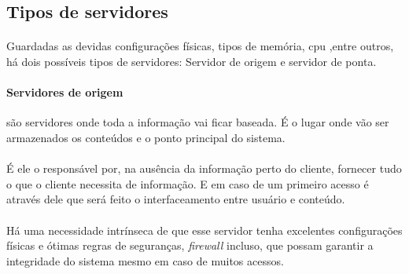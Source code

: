 \subsection{Tipos de servidores}
\label{section:tipos_de_servidores}
\paragraph{}
Guardadas as devidas configura\c{c}\~oes f\'isicas, tipos de mem\'oria, cpu ,entre outros, h\'a dois poss\'iveis tipos de servidores:  Servidor de origem e servidor de ponta.

\paragraph{Servidores de origem}s\~ao servidores onde toda a informa\c{c}\~ao vai ficar baseada. \'E o lugar onde v\~ao ser armazenados os conte\'udos e o ponto principal do sistema.
\paragraph{}
\'E ele o respons\'avel por, na aus\^encia da informa\c{c}\~ao perto do cliente, fornecer tudo o que o cliente necessita de informa\c{c}\~ao. E em caso de um primeiro acesso \'e atrav\'es dele que ser\'a feito o interfaceamento entre usu\'ario e conte\'udo.
\paragraph{}
H\'a uma necessidade intr\'inseca de que esse servidor tenha excelentes configura\c{c}\~oes f\'isicas e \'otimas regras de seguran\c{c}as, \textit{firewall} incluso, que possam garantir a integridade do sistema mesmo em caso de muitos acessos.
